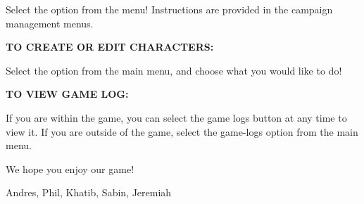Select the option from the menu! Instructions are provided in the campaign management menus. 

{\bfseries TO C\+R\+E\+A\+TE OR E\+D\+IT C\+H\+A\+R\+A\+C\+T\+E\+RS\+:} 

Select the option from the main menu, and choose what you would like to do! 

{\bfseries TO V\+I\+EW G\+A\+ME L\+OG\+:} 

If you are within the game, you can select the game logs button at any time to view it. If you are outside of the game, select the game-\/logs option from the main menu. 

We hope you enjoy our game!
\begin{DoxyItemize}
\item Andres, Phil, Khatib, Sabin, Jeremiah 
\end{DoxyItemize}